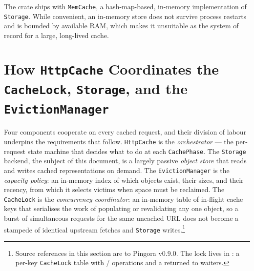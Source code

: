 The crate ships with \texttt{MemCache}, a hash-map-based, in-memory
implementation of \texttt{Storage}. While convenient, an in-memory store does
not survive process restarts and is bounded by available RAM, which makes it
unsuitable as the system of record for a large, long-lived cache.

\section{How \texttt{HttpCache} Coordinates the \texttt{CacheLock}, \texttt{Storage}, and the \texttt{EvictionManager}}

Four components cooperate on every cached request, and their division of labour
underpins the requirements that follow. \texttt{HttpCache} is the
\emph{orchestrator} --- the per-request state machine that decides what to do at
each \texttt{CachePhase}. The \texttt{Storage} backend, the subject of this
document, is a largely passive \emph{object store} that reads and writes cached
representations on demand. The \texttt{EvictionManager} is the \emph{capacity
policy}: an in-memory index of which objects exist, their sizes, and their
recency, from which it selects victims when space must be reclaimed. The
\texttt{CacheLock} is the \emph{concurrency coordinator}: an in-memory
table of in-flight cache keys that serialises the work of populating or
revalidating any one object, so a burst of simultaneous requests for the same
uncached URL does not become a stampede of identical upstream fetches and
\texttt{Storage} writes.\footnote{Source references in this section are to Pingora
  v0.9.0. The lock lives in
  : a
  per-key \texttt{CacheLock} table with
   /
   operations and a
   returned to waiters.}

